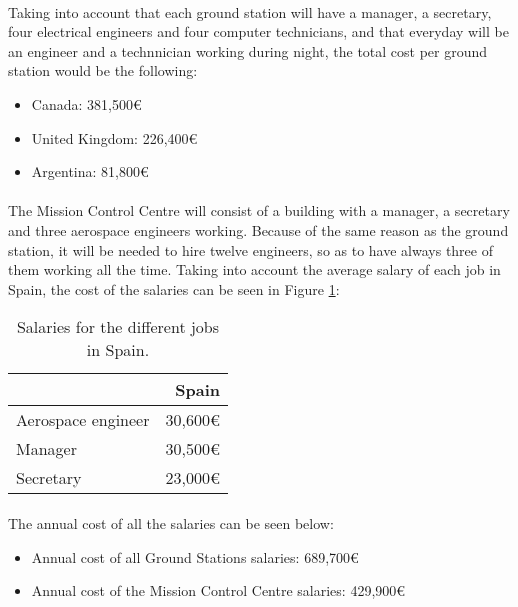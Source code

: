 \documentclass[12pt,a4paper]{report}
\begin{document}
\paragraph{}Taking into account that each ground station will have a manager, a secretary, four electrical engineers and four computer technicians, and that everyday will be an engineer and a technnician working during night, the total cost per ground station would be the following:
\begin{itemize}
\item Canada: 381,500\euro
\item United Kingdom: 226,400\euro
\item Argentina: 81,800\euro
\end{itemize}

\paragraph{}The Mission Control Centre will consist of a building with a manager, a secretary and three aerospace engineers working. Because of the same reason as the ground station, it will be needed to hire twelve engineers, so as to have always three of them working all the time. Taking into account the average salary of each job in Spain, the cost of the salaries can be seen in Figure \ref{table:SalariesSpain}:

\begin{table}[H]
\begin{center}
\begin{tabular}{|l|r|}
\hline 
 & Spain \\ 
\hline 
Aerospace engineer & 30,600\euro \\ 
\hline 
Manager & 30,500\euro  \\ 
\hline 
Secretary & 23,000\euro  \\ 
\hline 
\end{tabular}
\end{center}
\caption[Salaries in Spain]{Salaries for the different jobs in Spain.}
\label{table:SalariesSpain}
\end{table}

\paragraph{}The annual cost of all the salaries can be seen below:
\begin{itemize}
\item Annual cost of all Ground Stations salaries: 689,700\euro
\item Annual cost of the Mission Control Centre salaries: 429,900\euro
\end{itemize}
\end{document}

